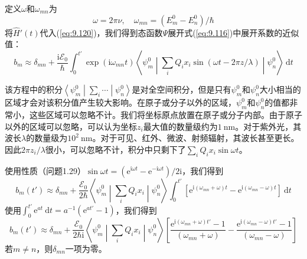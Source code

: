     定义$\omega$和$\omega_{mn}$为
    \begin{equation}
        \omega = 2\pi\nu, \quad \omega_{mn} = \left(E_m^0 - E_n^0\right)/\hbar
        \label{eq:9.122}
    \end{equation}
    将$\hat{H}'\left(t\right)$代入(\ref{eq:9.120})，我们得到态函数$\Psi$展开式(\ref{eq:9.116})中展开系数的近似值：
    \begin{equation*}
        b_m \approx \delta_{mn} + \frac{\mathrm{i}\mathscr{E}_0}{\hbar}\int_{0}^{t'} \exp\left(\mathrm{i}\omega_{mn}t\right)\left\langle \psi_m^0 \middle| \sum_i Q_i x_i \sin\left(\omega t - 2\pi z/\lambda\right) \middle| \psi_n^0 \right\rangle \:\mathrm{d}t
    \end{equation*}

    该方程中的积分$\left\langle \psi_m^0 \middle| \sum_i\cdots \middle| \psi_n^0 \right\rangle$是对全空间积分，但是只有$\psi_m^0$和$\psi_n^0$大小相当的区域才会对该积分值产生较大影响。在原子或分子以外的区域，$\psi_m^0$和$\psi_n^0$的值都非常小，这些区域可以忽略不计。我们将坐标原点放置在原子或分子内部。由于原子以外的区域可以忽略，可以认为坐标$z_i$最大值的数量级约为$1\:\mathrm{nm}$。对于紫外光，其波长$\lambda$的数量级为$10^2\:\mathrm{nm}$。对于可见、红外、微波、射频辐射，其波长甚至更长。因此$2\pi z_i/\lambda$很小，可以忽略不计，积分中只剩下了$\sum_i Q_i x_i \sin \omega t$。

    使用性质（问题1.29）$\sin \omega t = \left(\mathrm{e}^{\mathrm{i}\omega t} - \mathrm{e}^{-\mathrm{i}\omega t}\right)/2\mathrm{i}$，我们得到
    \begin{equation*}
        b_m\left(t'\right) \approx \delta_{mn} + \frac{\mathscr{E}_0}{2\hbar}\left\langle \psi_m^0 \middle| \sum_i Q_i x_i \middle| \psi_n^0 \right\rangle \int_{0}^{t'} \left[\mathrm{e}^{\mathrm{i}\left(\omega_{mn}+\omega\right)t} - \mathrm{e}^{\mathrm{i}\left(\omega_{mn}-\omega\right)t}\right]\:\mathrm{d}t
    \end{equation*}
    使用$\int_{0}^{t'} \mathrm{e}^{at}\:\mathrm{d}t = a^{-1}\left(\mathrm{e}^{at'} - 1\right)$，我们得到
    \begin{equation}
        b_m\left(t'\right) \approx \delta_{mn} + \frac{\mathscr{E}_0}{2\hbar\mathrm{i}}\left\langle \psi_m^0 \middle| \sum_i Q_i x_i \middle| \psi_n^0 \right\rangle \left[\frac{\mathrm{e}^{\mathrm{i}\left(\omega_{mn}+\omega\right)t'} - 1}{\left(\omega_{mn}+\omega\right)} - \frac{\mathrm{e}^{\mathrm{i}\left(\omega_{mn}-\omega\right)t'} - 1}{\left(\omega_{mn}-\omega\right)}\right]
        \label{eq:9.123}
    \end{equation}
    若$m \neq n$，则$\delta_{mn}$一项为零。

